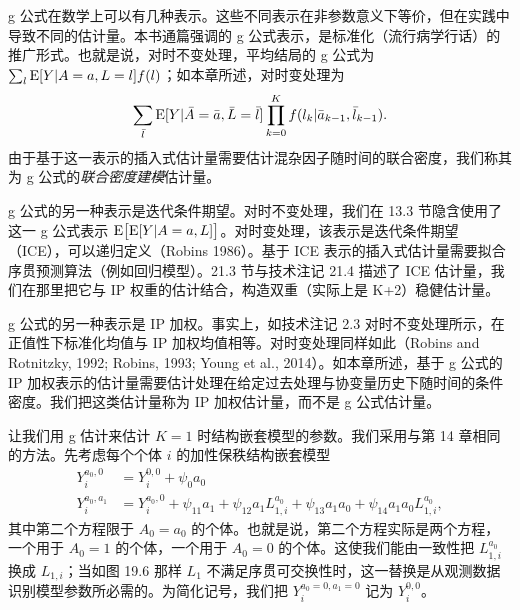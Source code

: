

\renewcommand{\FPname}{精要（Fine Point）}
\begin{finepoint}[g 公式的几种表示]
g 公式在数学上可以有几种表示。这些不同表示在非参数意义下等价，但在实践中导致不同的估计量。本书通篇强调的 g 公式表示，是标准化（流行病学行话）的推广形式。也就是说，对时不变处理，平均结局的 g 公式为 $\sum_l\mathrm{E}[Y|A=a,L=l]f(l)$；如本章所述，对时变处理为
\[
\sum_{\bar l}\mathrm{E}[Y|\bar A=\bar a,\bar L=\bar l]\prod_{k=0}^{K}f(l_k|\bar a_{k-1},\bar l_{k-1}).
\]
由于基于这一表示的插入式估计量需要估计混杂因子随时间的联合密度，我们称其为 g 公式的\emph{联合密度建模}估计量。

g 公式的另一种表示是迭代条件期望。对时不变处理，我们在 13.3 节隐含使用了这一 g 公式表示 $\mathrm{E}\big[\mathrm{E}[Y|A=a,L]\big]$。对时变处理，该表示是迭代条件期望（ICE），可以递归定义（Robins 1986）。基于 ICE 表示的插入式估计量需要拟合序贯预测算法（例如回归模型）。21.3 节与技术注记 21.4 描述了 ICE 估计量，我们在那里把它与 IP 权重的估计结合，构造双重（实际上是 K+2）稳健估计量。

g 公式的另一种表示是 IP 加权。事实上，如技术注记 2.3 对时不变处理所示，在正值性下标准化均值与 IP 加权均值相等。对时变处理同样如此（Robins and Rotnitzky, 1992; Robins, 1993; Young et al., 2014）。如本章所述，基于 g 公式的 IP 加权表示的估计量需要估计处理在给定过去处理与协变量历史下随时间的条件密度。我们把这类估计量称为 IP 加权估计量，而不是 g 公式估计量。
\end{finepoint}
\renewcommand{\FPname}{精要}

让我们用 g 估计来估计 $K=1$ 时结构嵌套模型的参数。我们采用与第 14 章相同的方法。先考虑每个个体 $i$ 的加性保秩结构嵌套模型
\[
\begin{aligned}
Y_i^{a_0,0}&=Y_i^{0,0}+\psi_{0}a_{0}\\
Y_i^{a_0,a_1}&=Y_i^{a_0,0}+\psi_{11}a_1+\psi_{12}a_1L_{1,i}^{a_0}+\psi_{13}a_1a_0+\psi_{14}a_1a_0L_{1,i}^{a_0},
\end{aligned}
\]
其中第二个方程限于 $A_0=a_0$ 的个体。也就是说，第二个方程实际是两个方程，一个用于 $A_0=1$ 的个体，一个用于 $A_0=0$ 的个体。这使我们能由一致性把 $L_{1,i}^{a_0}$ 换成 $L_{1,i}$；当如图 19.6 那样 $L_1$ 不满足序贯可交换性时，这一替换是从观测数据识别模型参数所必需的。为简化记号，我们把 $Y_i^{a_0=0,a_1=0}$ 记为 $Y_i^{0,0}$。


